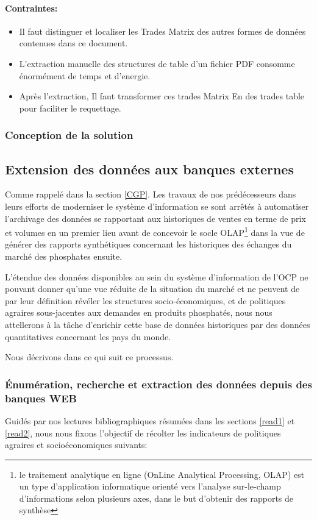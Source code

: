 	\paragraph{Contraintes:}
	\begin{itemize}
		\item Il faut distinguer et localiser les Trades Matrix des autres formes de données contenues dans ce document.
		\item L'extraction manuelle des structures de table d'un fichier PDF consomme énormément de temps et d'energie.
		\item Après l'extraction, Il faut transformer ces trades Matrix En des trades table pour faciliter le requettage.
	\end{itemize}
	\subsubsection{Conception de la solution}
	\subsection{Extension des données aux banques externes}
	Comme rappelé dans la section \ref{CGP}. Les travaux de nos prédécesseurs dans leurs efforts de moderniser le système d'information se sont arrêtés à automatiser l'archivage des données se rapportant aux historiques de ventes en terme de prix et volumes en un premier lieu\cite{CHEMLAL} avant de concevoir le socle OLAP\footnote{le traitement analytique en ligne (OnLine Analytical Processing, OLAP) est un type d'application informatique orienté vers l'analyse sur-le-champ d'informations selon plusieurs axes, dans le but d'obtenir des rapports de synthèse} dans la vue de générer des rapports synthétiques concernant les historiques des échanges du marché des phosphates ensuite\cite{NACER}.
	\par
	L'étendue des données disponibles au sein du système d'information de l'OCP ne pouvant donner qu'une vue réduite de la situation du marché et ne peuvent de par leur définition révéler les structures socio-économiques,  et de politiques agraires sous-jacentes aux demandes en produits phosphatés, nous nous attellerons à la tâche d'enrichir cette base de données historiques par des données quantitatives concernant les pays du monde.
	\par
	Nous décrivons dans ce qui suit ce processus. 
	\subsubsection{Énumération, recherche et extraction des données depuis des banques WEB}
		Guidés par nos lectures bibliographiques résumées dans les sections \ref{read1} et \ref{read2}, nous nous fixons l'objectif de récolter les indicateurs de politiques agraires et socioéconomiques suivants:
